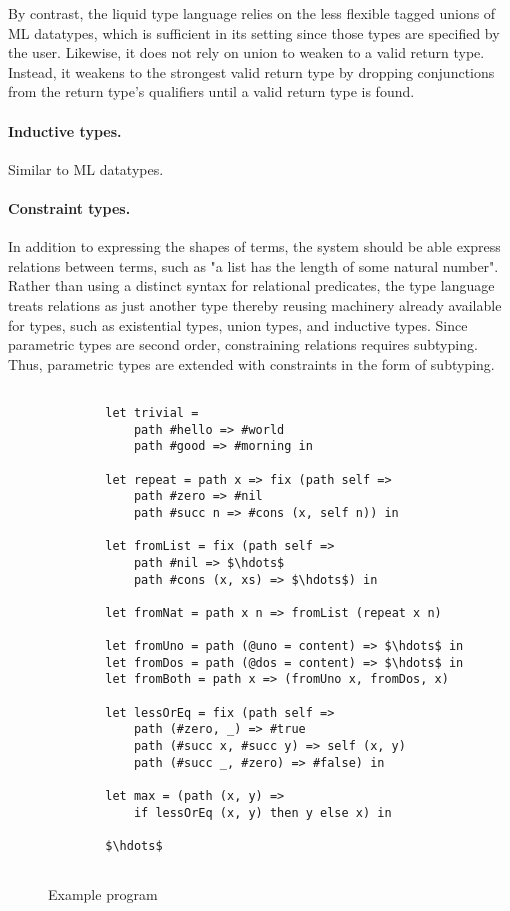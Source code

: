 \documentclass[acmsmall]{acmart}
\begin{document}
By contrast, the liquid type language relies on the less flexible tagged unions of ML datatypes, 
which is sufficient in its setting since those types are specified by the user. 
Likewise, it does not rely on union to weaken to a valid return type. 
Instead, it weakens to the strongest valid return type by dropping conjunctions from 
the return type's qualifiers until a valid return type is found.

\paragraph{Inductive types.} Similar to ML datatypes.

\paragraph{Constraint types.}
In addition to expressing the shapes of terms, the system should be able express relations between terms,
such as "a list has the length of some natural number".
Rather than using a distinct syntax for relational predicates, 
the type language treats relations as just another type thereby reusing machinery already 
available for types, such as existential types, union types, and inductive types.
Since parametric types are second order, constraining relations requires subtyping.
Thus, parametric types are extended with constraints in the form of subtyping.



\begin{figure*}[h]

    \begin{lstlisting}[mathescape=true]

        let trivial =
            path #hello => #world
            path #good => #morning in

        let repeat = path x => fix (path self =>
            path #zero => #nil
            path #succ n => #cons (x, self n)) in

        let fromList = fix (path self =>
            path #nil => $\hdots$
            path #cons (x, xs) => $\hdots$) in

        let fromNat = path x n => fromList (repeat x n)

        let fromUno = path (@uno = content) => $\hdots$ in
        let fromDos = path (@dos = content) => $\hdots$ in
        let fromBoth = path x => (fromUno x, fromDos, x)

        let lessOrEq = fix (path self =>
            path (#zero, _) => #true
            path (#succ x, #succ y) => self (x, y)
            path (#succ _, #zero) => #false) in

        let max = (path (x, y) => 
            if lessOrEq (x, y) then y else x) in

        $\hdots$


    \end{lstlisting}

\caption{Example program}
\label{fig:program}
\end{figure*}
\end{document}
